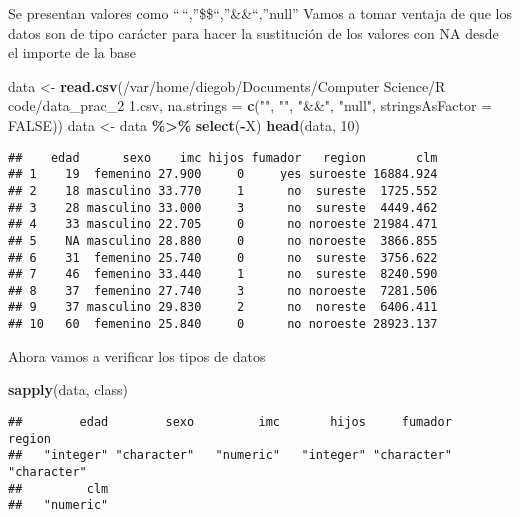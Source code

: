 \documentclass[
]{article}
\newenvironment{Shaded}{\begin{snugshade}}{\end{snugshade}}
\newcommand{\AttributeTok}[1]{\textcolor[rgb]{0.13,0.29,0.53}{#1}}
\newcommand{\ConstantTok}[1]{\textcolor[rgb]{0.56,0.35,0.01}{#1}}
\newcommand{\DecValTok}[1]{\textcolor[rgb]{0.00,0.00,0.81}{#1}}
\newcommand{\FunctionTok}[1]{\textcolor[rgb]{0.13,0.29,0.53}{\textbf{#1}}}
\newcommand{\NormalTok}[1]{#1}
\newcommand{\OtherTok}[1]{\textcolor[rgb]{0.56,0.35,0.01}{#1}}
\newcommand{\SpecialCharTok}[1]{\textcolor[rgb]{0.81,0.36,0.00}{\textbf{#1}}}
\newcommand{\StringTok}[1]{\textcolor[rgb]{0.31,0.60,0.02}{#1}}
\begin{document}
Se presentan valores como ``\,``,''\$\$``,''\&\&``,''null'' Vamos a
tomar ventaja de que los datos son de tipo carácter para hacer la
sustitución de los valores con NA desde el importe de la base

\begin{Shaded}
\begin{Highlighting}[]
\NormalTok{data }\OtherTok{\textless{}{-}} \FunctionTok{read.csv}\NormalTok{(}\StringTok{\textquotesingle{}/var/home/diegob/Documents/Computer Science/R code/data\_prac\_2 1.csv\textquotesingle{}}\NormalTok{, }\AttributeTok{na.strings =} \FunctionTok{c}\NormalTok{(}\StringTok{""}\NormalTok{, }\StringTok{"$$"}\NormalTok{, }\StringTok{"\&\&"}\NormalTok{, }\StringTok{"null"}\NormalTok{, }\AttributeTok{stringsAsFactor =} \ConstantTok{FALSE}\NormalTok{))}
\NormalTok{data }\OtherTok{\textless{}{-}}\NormalTok{ data }\SpecialCharTok{\%\textgreater{}\%} \FunctionTok{select}\NormalTok{(}\SpecialCharTok{{-}}\NormalTok{X)}
\FunctionTok{head}\NormalTok{(data, }\DecValTok{10}\NormalTok{)}
\end{Highlighting}
\end{Shaded}

\begin{verbatim}
##    edad      sexo    imc hijos fumador   region       clm
## 1    19  femenino 27.900     0     yes suroeste 16884.924
## 2    18 masculino 33.770     1      no  sureste  1725.552
## 3    28 masculino 33.000     3      no  sureste  4449.462
## 4    33 masculino 22.705     0      no noroeste 21984.471
## 5    NA masculino 28.880     0      no noroeste  3866.855
## 6    31  femenino 25.740     0      no  sureste  3756.622
## 7    46  femenino 33.440     1      no  sureste  8240.590
## 8    37  femenino 27.740     3      no noroeste  7281.506
## 9    37 masculino 29.830     2      no  noreste  6406.411
## 10   60  femenino 25.840     0      no noroeste 28923.137
\end{verbatim}

Ahora vamos a verificar los tipos de datos

\begin{Shaded}
\begin{Highlighting}[]
\FunctionTok{sapply}\NormalTok{(data, class)}
\end{Highlighting}
\end{Shaded}

\begin{verbatim}
##        edad        sexo         imc       hijos     fumador      region 
##   "integer" "character"   "numeric"   "integer" "character" "character" 
##         clm 
##   "numeric"
\end{verbatim}
\end{document}
